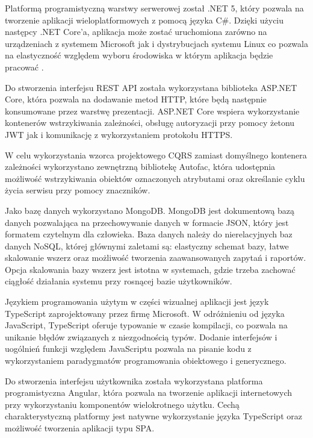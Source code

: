 \documentclass[a4paper,twoside,12pt]{book}
\begin{document}
	Platformą programistyczną warstwy serwerowej został .NET 5, który pozwala na tworzenie aplikacji wieloplatformowych z pomocą języka C\#. Dzięki użyciu następcy .NET Core'a, aplikacja może zostać uruchomiona zarówno na urządzeniach z systemem Microsoft jak i dystrybucjach systemu Linux co pozwala na elastyczność względem wyboru środowiska w którym aplikacja będzie pracować \cite{bib:dotnet5introduction}.
	
	Do stworzenia interfejsu REST API została wykorzystana biblioteka ASP.NET Core, która pozwala na dodawanie metod HTTP, które będą następnie konsumowane przez warstwę prezentacji. ASP.NET Core wspiera wykorzystanie kontenerów wstrzykiwania zależności, obsługę autoryzacji przy pomocy żetonu JWT jak i komunikację z wykorzystaniem protokołu HTTPS\cite{bib:asp}.
	
	W celu wykorzystania wzorca projektowego CQRS zamiast domyślnego kontenera zależności wykorzystano zewnętrzną bibliotekę Autofac, która udostępnia możliwość wstrzykiwania obiektów oznaczonych atrybutami oraz określanie cyklu życia serwisu przy pomocy znaczników\cite{bib:autofactag}.
	
	Jako bazę danych wykorzystano MongoDB. MongoDB jest dokumentową bazą danych pozwalająca na przechowywanie danych w formacie JSON, który jest formatem czytelnym dla człowieka. Baza danych należy do nierelacyjnych baz danych NoSQL, której głównymi zaletami są: elastyczny schemat bazy, łatwe skalowanie wszerz oraz możliwość tworzenia zaawansowanych zapytań i raportów\cite{bib:mongodb_guide}. Opcja skalowania bazy wszerz jest istotna w systemach, gdzie trzeba zachować ciągłość działania systemu przy rosnącej bazie użytkowników.
	
	Językiem programowania użytym w części wizualnej aplikacji jest język TypeScript zaprojektowany przez firmę Microsoft. W odróżnieniu od języka JavaScript, TypeScript oferuje typowanie w czasie kompilacji, co pozwala na unikanie błędów związanych z niezgodnością typów. Dodanie interfejsów i uogólnień funkcji względem JavaScriptu pozwala na pisanie kodu z wykorzystaniem paradygmatów programowania obiektowego i generycznego\cite{bib:typescript}.
	
	Do stworzenia interfejsu użytkownika została wykorzystana platforma programistyczna Angular, która pozwala na tworzenie aplikacji internetowych przy wykorzystaniu komponentów wielokrotnego użytku. Cechą charakterystyczną platformy jest natywne wykorzystanie języka TypeScript oraz możliwość tworzenia aplikacji typu SPA\cite{bib:anuglar}\cite{bib:typescript}.
	
\end{document}
